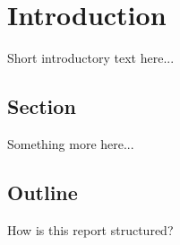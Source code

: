 \chapter{Introduction}
Short introductory text here...

\section{Section}
Something more here...

\section{Outline}
How is this report structured?
